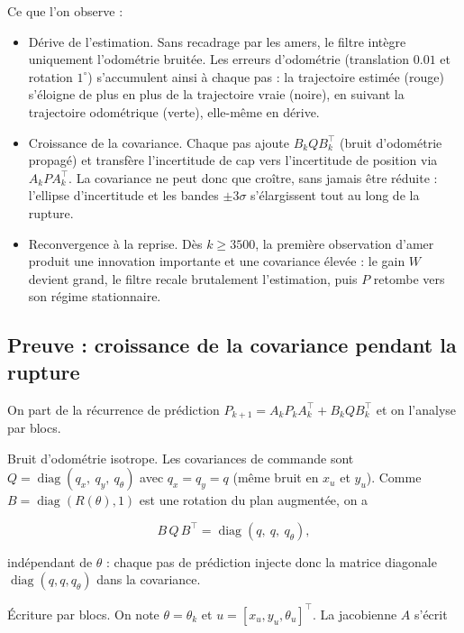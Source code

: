 \documentclass[11pt]{article}
\theoremstyle{remark}
\theoremstyle{definition}
\begin{document}
Ce que l'on observe :

\begin{itemize}
\item Dérive de l'estimation. Sans recadrage par les amers, le filtre intègre
  uniquement l'odométrie bruitée. Les erreurs d'odométrie (translation $0.01$ et rotation
  $1^\circ$) s'accumulent ainsi à chaque pas : la trajectoire estimée (rouge) s'éloigne
  de plus en plus de la trajectoire vraie (noire), en suivant la trajectoire odométrique
  (verte), elle-même en dérive.

\item Croissance de la covariance. Chaque pas ajoute $B_k Q B_k^\top$ (bruit
  d'odométrie propagé) et transfère l'incertitude de cap vers l'incertitude de
  position via $A_k P A_k^\top$. La covariance ne peut donc que croître, sans jamais
  être réduite : l'ellipse d'incertitude et les bandes $\pm 3\sigma$ s'élargissent
  tout au long de la rupture.

\item Reconvergence à la reprise. Dès $k \ge 3500$, la première observation d'amer
  produit une innovation importante et une covariance élevée : le gain $W$ devient
  grand, le filtre recale brutalement l'estimation, puis $P$ retombe vers son
  régime stationnaire.
\end{itemize}

\subsection{Preuve : croissance de la covariance pendant la rupture}

On part de la récurrence de prédiction $P_{k+1} = A_k P_k A_k^\top + B_k Q B_k^\top$ et on
l'analyse par blocs.

Bruit d'odométrie isotrope. Les covariances de commande sont
$Q = \operatorname{diag}(q_x,\ q_y,\ q_\theta)$ avec $q_x = q_y = q$ (même bruit en $x_u$ et
$y_u$). Comme $B = \operatorname{diag}(R(\theta), 1)$ est une rotation du plan augmentée, on a

\begin{equation}
B\,Q\,B^\top = \operatorname{diag}(q,\ q,\ q_\theta),
\end{equation}

indépendant de $\theta$ : chaque pas de prédiction injecte donc la matrice diagonale
$\operatorname{diag}(q, q, q_\theta)$ dans la covariance.

Écriture par blocs. On note $\theta = \theta_k$ et $u = [x_u, y_u, \theta_u]^\top$.
La jacobienne $A$ s'écrit
\end{document}
